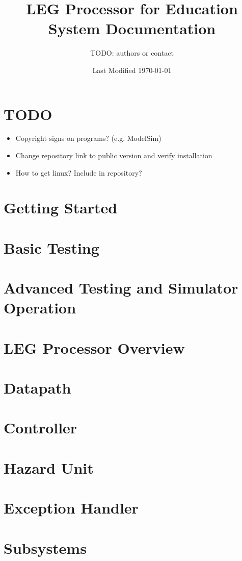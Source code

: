 \documentclass[12pt]{article}
\begin{document}
\title{LEG Processor for Education\\\Large{System Documentation}
}
\author{TODO: authors or contact}
\date{Last Modified \today}
\maketitle
\thispagestyle{empty}
\pagebreak
\setcounter{page}{1}
\pagebreak

\tableofcontents
\pagebreak

\section{TODO}
\begin{itemize}
\item Copyright signs on programs? (e.g. ModelSim)
\item Change repository link to public version and verify installation
\item How to get linux? Include in repository?
\end{itemize}

\section{Getting Started}


\section{Basic Testing}

\pagebreak

\section{Advanced Testing and Simulator Operation}

\pagebreak

\section{LEG Processor Overview}


\section{Datapath}


\section{Controller}


\section{Hazard Unit}


\section{Exception Handler}



\section{Subsystems}

\pagebreak


\pagebreak


\pagebreak
\end{document}
